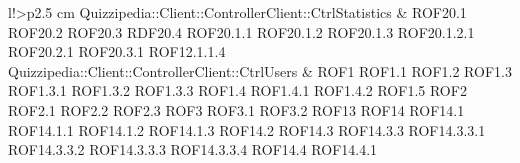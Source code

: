 \begin{tabella}{l!{\VRule}>{\centering\arraybackslash}p{2.5 cm}}
Quizzipedia::Client::ControllerClient::CtrlStatistics & ROF20.1 \linebreak ROF20.2 \linebreak ROF20.3 \linebreak RDF20.4 \linebreak ROF20.1.1 \linebreak ROF20.1.2 \linebreak ROF20.1.3 \linebreak ROF20.1.2.1 \linebreak ROF20.2.1 \linebreak ROF20.3.1 \linebreak ROF12.1.1.4 \\
Quizzipedia::Client::ControllerClient::CtrlUsers & ROF1 \linebreak ROF1.1 \linebreak ROF1.2 \linebreak ROF1.3 \linebreak ROF1.3.1 \linebreak ROF1.3.2 \linebreak ROF1.3.3 \linebreak ROF1.4 \linebreak ROF1.4.1 \linebreak ROF1.4.2 \linebreak ROF1.5 \linebreak ROF2 \linebreak ROF2.1 \linebreak ROF2.2 \linebreak ROF2.3 \linebreak ROF3 \linebreak ROF3.1 \linebreak ROF3.2 \linebreak ROF13 \linebreak ROF14 \linebreak ROF14.1 \linebreak ROF14.1.1 \linebreak ROF14.1.2 \linebreak ROF14.1.3 \linebreak ROF14.2 \linebreak ROF14.3 \linebreak ROF14.3.3 \linebreak ROF14.3.3.1 \linebreak ROF14.3.3.2 \linebreak ROF14.3.3.3 \linebreak ROF14.3.3.4 \linebreak ROF14.4 \linebreak ROF14.4.1 \\

\end{tabella}
